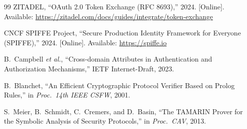 \documentclass[journal]{IEEEtran}
\theoremstyle{definition}
\begin{document}
\begin{thebibliography}{99}
ZITADEL,
``OAuth 2.0 Token Exchange (RFC 8693),'' 2024.
[Online]. Available:
\url{https://zitadel.com/docs/guides/integrate/token-exchange}

CNCF SPIFFE Project,
``Secure Production Identity Framework for Everyone (SPIFFE),'' 2024.
[Online]. Available: \url{https://spiffe.io}

B.\ Campbell \textit{et al.},
``Cross-domain Attributes in Authentication and Authorization Mechanisms,''
IETF Internet-Draft, 2023.

B.\ Blanchet,
``An Efficient Cryptographic Protocol Verifier Based on Prolog Rules,''
in \textit{Proc.\ 14th IEEE CSFW}, 2001.

S.\ Meier, B.\ Schmidt, C.\ Cremers, and D.\ Basin,
``The TAMARIN Prover for the Symbolic Analysis of Security Protocols,''
in \textit{Proc.\ CAV}, 2013.

\end{thebibliography}
\end{document}
